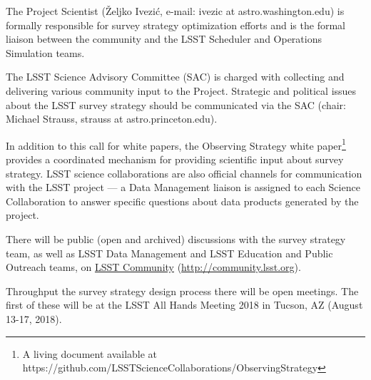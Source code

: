\documentclass[DM,lsstdraft,toc,usenatbib]{lsstdoc}
\begin{document}
The Project Scientist (\v{Z}eljko Ivezi\'{c}, e-mail: ivezic at astro.washington.edu) is formally responsible for survey strategy optimization efforts and is the formal liaison between the community and the LSST Scheduler and Operations Simulation teams.

The LSST Science Advisory Committee (SAC) is charged with collecting and delivering various community input to the Project. Strategic and political issues about the LSST survey strategy should be communicated via the SAC (chair: Michael Strauss, strauss at astro.princeton.edu).

In addition to this call for white papers, the Observing Strategy white paper\footnote{A living document available at https://github.com/LSSTScienceCollaborations/ObservingStrategy} provides a coordinated mechanism for providing scientific input about survey strategy. LSST science collaborations are also official channels for communication with the LSST project --- a Data Management liaison is assigned to each Science Collaboration to answer specific questions about data products generated by the project.

There will be public (open and archived) discussions with the survey strategy team, as well as LSST Data Management and LSST Education and Public Outreach teams, on \href{http://community.lsst.org}{LSST Community} (\url{http://community.lsst.org}). 

Throughput the survey strategy design process there will be open meetings. The first of these will be at the LSST All Hands Meeting 2018 in Tucson, AZ (August 13-17, 2018). 
\end{document}
